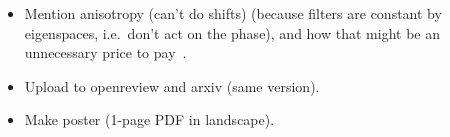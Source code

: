 \begin{itemize}
    \item Mention anisotropy (can't do shifts) (because filters are constant by eigenspaces, i.e.\ don't act on the phase), and how that might be an unnecessary price to pay~\cite{defferrard2020deepsphere}.
    \item Upload to openreview and arxiv (same version).
    \item Make poster (1-page PDF in landscape).
\end{itemize}
\clearpage
